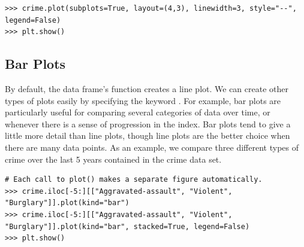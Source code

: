 \begin{lstlisting}
>>> crime.plot(subplots=True, layout=(4,3), linewidth=3, style="--", legend=False)
>>> plt.show()
\end{lstlisting}

\subsection*{Bar Plots}

By default, the data frame's  function creates a line plot.
We can create other types of plots easily by specifying the keyword .
For example, bar plots are particularly useful for comparing several categories of data over time, or whenever there is a sense of progression in the index.
Bar plots tend to give a little more detail than line plots, though line plots are the better choice when there are many data points.
As an example, we compare three different types of crime over the last 5 years contained in the crime data set.

\begin{lstlisting}
# Each call to plot() makes a separate figure automatically.
>>> crime.iloc[-5:][["Aggravated-assault", "Violent", "Burglary"]].plot(kind="bar")
>>> crime.iloc[-5:][["Aggravated-assault", "Violent", "Burglary"]].plot(kind="bar", stacked=True, legend=False)
>>> plt.show()
\end{lstlisting}

